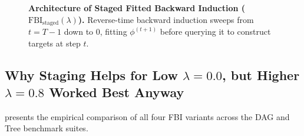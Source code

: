 \documentclass[11pt,a4paper]{article}
\begin{document}
\begin{figure}[ht!]
{%
}
\caption{\textbf{Architecture of Staged Fitted Backward Induction ($\text{FBI}_{\text{staged}}(\lambda)$).} Reverse-time backward induction sweeps from $t = T-1$ down to $0$, fitting $\phi^{(t+1)}$ before querying it to construct targets at step $t$.}
\label{fig:staged_fbi_diagram}
\end{figure}

\subsection{\texorpdfstring{Why Staging Helps for Low $\lambda=0.0$, but Higher $\lambda=0.8$ Worked Best Anyway}{Why Staging Helps for Low lambda=0.0, but Higher lambda=0.8 Worked Best Anyway}}

 presents the empirical comparison of all four FBI variants across the DAG and Tree benchmark suites.
\end{document}
